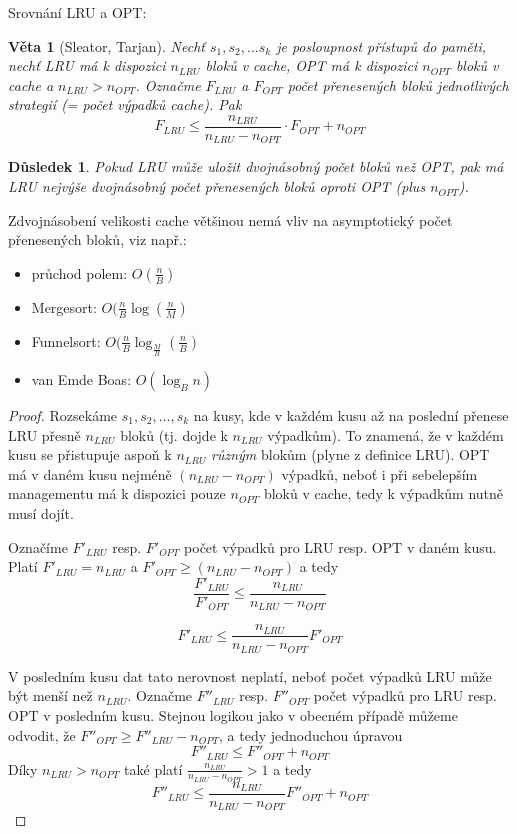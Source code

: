 \documentclass[11pt]{report} %
\newtheorem{theorem}{Věta}[section]
\newtheorem{implication}{Důsledek}[section]
\numberwithin{equation}{section}
\begin{document}
Srovnání LRU a OPT:
\begin{theorem}[Sleator, Tarjan]
Nechť $s_1, s_2, \dots s_k$ je posloupnost přístupů do paměti, nechť LRU má k dispozici $n_{LRU}$ bloků v cache, OPT má k dispozici $n_{OPT}$ bloků v cache a $n_{LRU} > n_{OPT}$. Označme $F_{LRU}$ a $F_{OPT}$ počet přenesených bloků jednotlivých strategií (= počet výpadků cache). Pak
$$F_{LRU} \leq \frac{n_{LRU}}{n_{LRU} - n_{OPT}}\cdot F_{OPT} + n_{OPT}$$
\end{theorem}
\begin{implication}
Pokud LRU může uložit dvojnásobný počet bloků než OPT, pak má LRU nejvýše dvojnásobný počet přenesených bloků oproti OPT (plus $n_{OPT}$).
\end{implication}
Zdvojnásobení velikosti cache většinou nemá vliv na asymptotický počet přenesených bloků, viz např.:
\begin{itemize}
	\item průchod polem: $O(\frac{n}{B})$
	\item Mergesort: $O(\frac{n}{B}\log (\frac{n}{M})$
	\item Funnelsort: $O(\frac{n}{B}\log_{\frac{M}{B}} (\frac{n}{B})$
	\item van Emde Boas: $O(\log_B n)$
\end{itemize}

\begin{proof}
Rozsekáme $s_1, s_2, \dots, s_k$ na kusy, kde v každém kusu až na poslední přenese LRU přesně $n_{LRU}$ bloků (tj. dojde k $n_{LRU}$ výpadkům). To znamená, že v každém kusu se přistupuje aspoň k $n_{LRU}$ \textit{různým} blokům (plyne z definice LRU). OPT má v daném kusu nejméně $(n_{LRU} - n_{OPT})$ výpadků, neboť i při sebelepším managementu má k dispozici pouze $n_{OPT}$ bloků v cache, tedy k výpadkům nutně musí dojít.

Označíme $F'_{LRU}$ resp. $F'_{OPT}$ počet výpadků pro LRU resp. OPT v daném kusu. Platí $F'_{LRU} = n_{LRU}$ a $F'_{OPT} \geq (n_{LRU} - n_{OPT})$ a tedy
$$\frac{F'_{LRU}}{F'_{OPT}} \leq \frac{n_{LRU}}{n_{LRU} - n_{OPT}}$$

$$F'_{LRU} \leq \frac{n_{LRU}}{n_{LRU} - n_{OPT}} F'_{OPT}$$

V posledním kusu dat tato nerovnost neplatí, neboť počet výpadků LRU může být menší než $n_{LRU}$. Označme $F''_{LRU}$ resp. $F''_{OPT}$ počet výpadků pro LRU resp. OPT v posledním kusu. Stejnou logikou jako v obecném případě můžeme odvodit, že $F''_{OPT} \geq F''_{LRU} - n_{OPT}$, a tedy jednoduchou úpravou  
$$F''_{LRU} \leq F''_{OPT} + n_{OPT}$$
Díky $n_{LRU} > n_{OPT}$ také platí $\frac{n_{LRU}}{n_{LRU} - n_{OPT}} > 1$ a tedy
$$F''_{LRU} \leq \frac{n_{LRU}}{n_{LRU} - n_{OPT}}F''_{OPT} + n_{OPT}$$
\end{proof}
\end{document}
